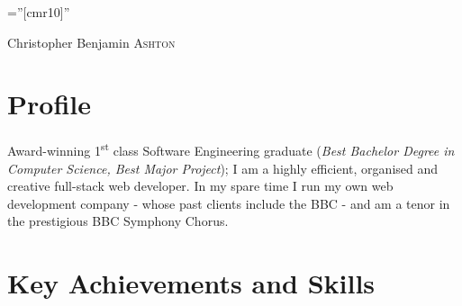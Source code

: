 \documentclass[a4paper,10pt]{article}
\begin{document}
\pagestyle{empty} %

\font\fb=''[cmr10]'' %

\par{\centering
		{\Huge Christopher Benjamin \textsc{Ashton}
	}\bigskip\par}

\begin{center}
\customcontact
\end{center}


\section{Profile}

Award-winning 1\textsuperscript{st} class Software Engineering graduate (\emph{Best Bachelor Degree in Computer Science, Best Major Project}); I am a highly efficient, organised and creative full-stack web developer. In my spare time I run my own web development company - whose past clients include the BBC - and am a tenor in the prestigious BBC Symphony Chorus.

\section{Key Achievements and Skills}
\end{document}
